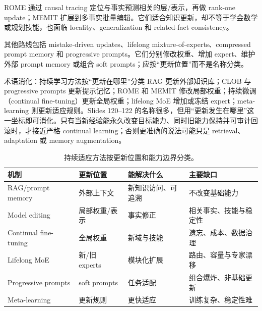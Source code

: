 ROME 通过 causal tracing 定位与事实预测相关的层/表示，再做 rank-one update；MEMIT 扩展到多事实批量编辑。它们适合知识更新，却不等于学会数学或规划技能，也面临 locality、generalization 和 related-fact consistency。



其他路线包括 mistake-driven updates、lifelong mixture-of-experts、compressed prompt memory 和 progressive prompts。它们分别修改权重、增加 expert、维护外部 prompt memory 或组合 soft prompts；应按“更新位置”而不是名称分类。





\begin{knowledgebox}{术语消化：持续学习方法按“更新在哪里”分类}
RAG 更新外部知识库；CLOB 与 progressive prompts 更新提示记忆；ROME 和 MEMIT 修改局部权重；持续微调（continual fine-tuning）更新全局权重；lifelong MoE 增加或冻结 expert；meta-learning 则更新适应规则。Slides 120--122 的名称很多，但用“更新发生在哪里”这一坐标即可消化。只有当新经验能永久改变目标能力、同时旧能力保持并可审计回滚时，才接近严格 continual learning；否则更准确的说法可能只是 retrieval、adaptation 或 memory augmentation。
\end{knowledgebox}


\begin{table}[H]
\centering
\small
\begin{tabularx}{\textwidth}{L{0.18\textwidth} L{0.20\textwidth} X X}
\toprule
机制 & 更新位置 & 能解决什么 & 主要缺口 \\
\midrule
RAG/prompt memory & 外部上下文 & 新知识访问、可追溯 & 不改变基础能力 \\
Model editing & 局部权重/表示 & 事实修正 & 相关事实、技能与稳定性 \\
Continual fine-tuning & 全局权重 & 新域与技能 & 遗忘、成本、数据治理 \\
Lifelong MoE & 新/旧 experts & 模块化扩展 & 路由、容量与专家漂移 \\
Progressive prompts & soft prompts & 任务适配 & 组合爆炸、非基础更新 \\
Meta-learning & 更新规则 & 更快适应 & 训练复杂、稳定性难 \\
\bottomrule
\end{tabularx}
\caption{持续适应方法按更新位置和能力边界分类。}
\end{table}

